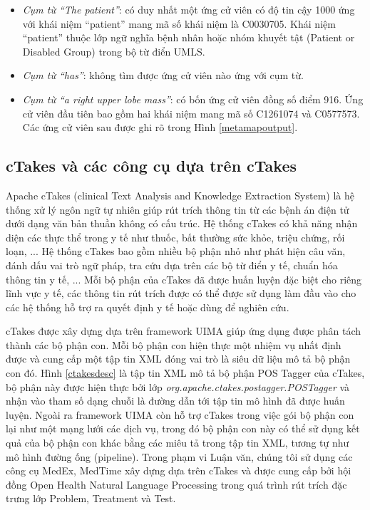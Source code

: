 \begin{itemize}[noitemsep]
\item \emph{Cụm từ ``The patient''}: có duy nhất một ứng cử viên có độ tin cậy 1000 ứng với khái niệm ``patient'' mang mã số khái niệm là C0030705. Khái niệm ``patient'' thuộc lớp ngữ nghĩa bệnh nhân hoặc nhóm khuyết tật (Patient or Disabled Group) trong bộ từ điển UMLS.
\item \emph{Cụm từ ``has''}: không tìm được ứng cử viên nào ứng với cụm từ.
\item \emph{Cụm từ ``a right upper lobe mass''}: có bốn ứng cử viên đồng số điểm 916. Ứng cử viên đầu tiên bao gồm hai khái niệm mang mã số C1261074 và C0577573. Các ứng cử viên sau được ghi rõ trong Hình \ref{metamapoutput}. 
\end{itemize}

\subsection*{cTakes và các công cụ dựa trên cTakes}
Apache cTakes (clinical Text Analysis and Knowledge Extraction System) là hệ thống xử lý ngôn ngữ tự nhiên giúp rút trích thông tin từ các bệnh án điện tử dưới dạng văn bản thuần không có cấu trúc. Hệ thống cTakes có khả năng nhận diện các thực thể trong y tế như thuốc, bất thường sức khỏe, triệu chứng, rối loạn, ... Hệ thống cTakes bao gồm nhiều bộ phận nhỏ như phát hiện câu văn, đánh dấu vai trò ngữ pháp, tra cứu dựa trên các bộ từ điển y tế, chuẩn hóa thông tin y tế, ... Mỗi bộ phận của cTakes đã được huấn luyện đặc biệt  cho riêng lĩnh vực y tế, các thông tin rút trích được có thể được sử dụng làm đầu vào cho các hệ thống hỗ trợ ra quyết định y tế hoặc dùng để nghiên cứu.

cTakes được xây dựng dựa trên framework UIMA giúp ứng dụng được phân tách thành các bộ phận con. Mỗi bộ phận con hiện thực một nhiệm vụ nhất định được và cung cấp một tập tin XML đóng vai trò là siêu dữ liệu mô tả bộ phận con đó. Hình \ref{ctakesdesc} là tập tin XML mô tả bộ phận POS Tagger của cTakes, bộ phận này được hiện thực bởi lớp \textit{org.apache.ctakes.postagger.POSTagger} và nhận vào tham số dạng chuỗi là đường dẫn tới tập tin mô hình đã được huấn luyện. Ngoài ra framework UIMA còn hỗ trợ cTakes trong việc gói bộ phận con lại như một mạng lưới các dịch vụ, trong đó bộ phận con này có thể sử dụng kết quả của bộ phận con khác bằng các miêu tả trong tập tin XML, tương tự như mô hình đường ống (pipeline). Trong phạm vi Luận văn, chúng tôi sử dụng các công cụ MedEx, MedTime xây dựng dựa trên cTakes và được cung cấp bởi hội đồng Open Health Natural Language Processing trong quá trình rút trích đặc trưng lớp Problem, Treatment và Test.

